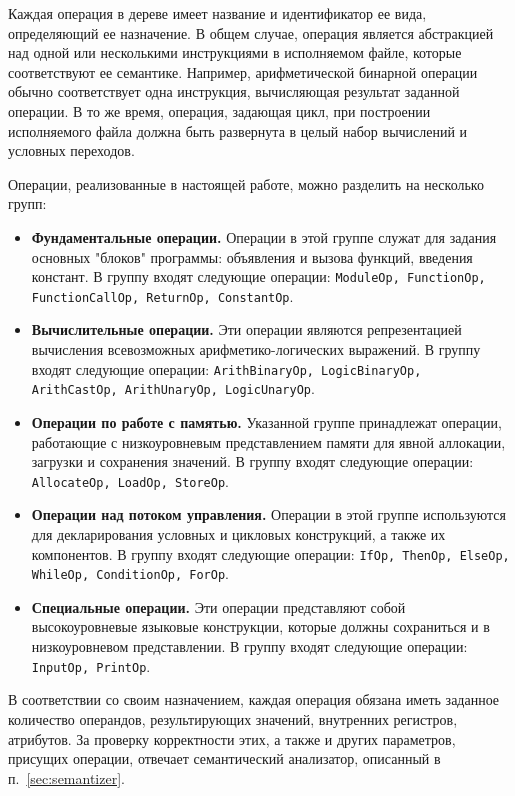 Каждая операция в дереве имеет название и идентификатор ее вида, определяющий ее назначение.
В общем случае, операция является абстракцией над одной или несколькими инструкциями в исполняемом файле, которые соответствуют ее семантике.
Например, арифметической бинарной операции обычно соответствует одна инструкция, вычисляющая результат заданной операции.
В то же время, операция, задающая цикл, при построении исполняемого файла должна быть развернута в целый набор вычислений и условных переходов.

Операции, реализованные в настоящей работе, можно разделить на несколько групп:

\begin{itemize}
    \item \textbf{Фундаментальные операции.}
          Операции в этой группе служат для задания основных "блоков" программы: объявления и вызова функций, введения констант.
          В группу входят следующие операции:
          \verb|ModuleOp, FunctionOp, FunctionCallOp, ReturnOp, ConstantOp|.
    \item \textbf{Вычислительные операции.}
          Эти операции являются репрезентацией вычисления всевозможных арифметико-логических выражений.
          В группу входят следующие операции:
          \verb|ArithBinaryOp, LogicBinaryOp, ArithCastOp, ArithUnaryOp, LogicUnaryOp|.
    \item \textbf{Операции по работе с памятью.}
          Указанной группе принадлежат операции, работающие с низкоуровневым представлением памяти для явной аллокации, загрузки и сохранения значений.
          В группу входят следующие операции:
          \verb|AllocateOp, LoadOp, StoreOp|.
    \item \textbf{Операции над потоком управления.}
          Операции в этой группе используются для декларирования условных и цикловых конструкций, а также их компонентов.
          В группу входят следующие операции:
          \verb|IfOp, ThenOp, ElseOp, WhileOp, ConditionOp, ForOp|.
    \item \textbf{Специальные операции.}
          Эти операции представляют собой высокоуровневые языковые конструкции, которые должны сохраниться и в низкоуровневом представлении.
          В группу входят следующие операции:
          \verb|InputOp, PrintOp|.
\end{itemize}

В соответствии со своим назначением, каждая операция обязана иметь заданное количество операндов, результирующих значений, внутренних регистров, атрибутов.
За проверку корректности этих, а также и других параметров, присущих операции, отвечает семантический анализатор, описанный в п.~\ref{sec:semantizer}.
